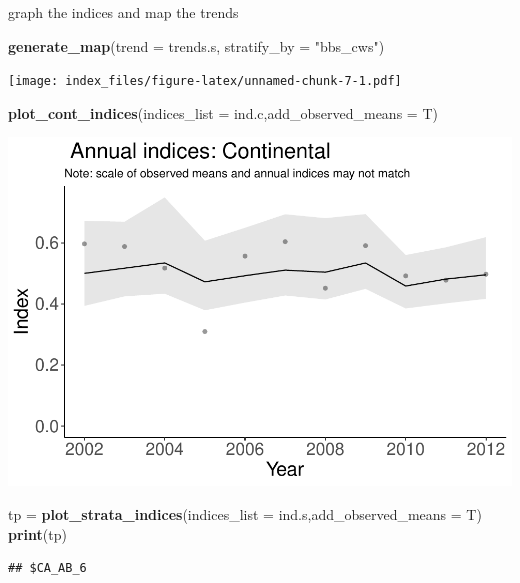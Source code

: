 \documentclass[]{article}
\newenvironment{Shaded}{\begin{snugshade}}{\end{snugshade}}
\newcommand{\KeywordTok}[1]{\textcolor[rgb]{0.13,0.29,0.53}{\textbf{#1}}}
\newcommand{\DataTypeTok}[1]{\textcolor[rgb]{0.13,0.29,0.53}{#1}}
\newcommand{\StringTok}[1]{\textcolor[rgb]{0.31,0.60,0.02}{#1}}
\newcommand{\NormalTok}[1]{#1}
\begin{document}
graph the indices and map the trends

\begin{Shaded}
\begin{Highlighting}[]
\KeywordTok{generate_map}\NormalTok{(}\DataTypeTok{trend =}\NormalTok{ trends.s, }\DataTypeTok{stratify_by =} \StringTok{"bbs_cws"}\NormalTok{)}
\end{Highlighting}
\end{Shaded}

\texttt{[image: index\_files/figure-latex/unnamed-chunk-7-1.pdf]}

\begin{Shaded}
\begin{Highlighting}[]
\KeywordTok{plot_cont_indices}\NormalTok{(}\DataTypeTok{indices_list =}\NormalTok{ ind.c,}\DataTypeTok{add_observed_means =}\NormalTok{ T)}
\end{Highlighting}
\end{Shaded}

\includegraphics{index_files/figure-latex/unnamed-chunk-7-2.pdf}

\begin{Shaded}
\begin{Highlighting}[]
\NormalTok{tp =}\StringTok{ }\KeywordTok{plot_strata_indices}\NormalTok{(}\DataTypeTok{indices_list =}\NormalTok{ ind.s,}\DataTypeTok{add_observed_means =}\NormalTok{ T)}
\KeywordTok{print}\NormalTok{(tp)}
\end{Highlighting}
\end{Shaded}

\begin{verbatim}
## $CA_AB_6
\end{verbatim}
\end{document}

